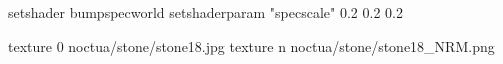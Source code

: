 setshader bumpspecworld
setshaderparam "specscale" 0.2 0.2 0.2

texture 0 noctua/stone/stone18.jpg
texture n noctua/stone/stone18_NRM.png
